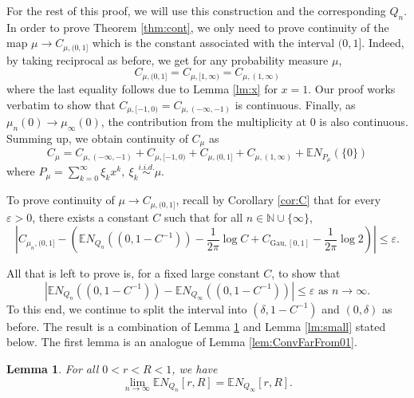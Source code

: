 \documentclass[12pt, reqno]{amsart}
\theoremstyle{plain}
\newtheorem{lemma}[theorem]{Lemma}
\theoremstyle{definition}
\newcommand\N{{\mathbb{N}}}
\newcommand\E{{\mathbb{E}}}
\newcommand{\ep}{\varepsilon}
\begin{document}
For the rest of this proof, we will use this construction and the corresponding $Q_{n}$. In order to prove Theorem \ref{thm:cont}, we only need to prove continuity of the map $\mu\to C_{\mu, (0, 1]}$ which is the constant associated with the interval $(0, 1]$. Indeed, by taking reciprocal as before, we get for any probability measure $\mu$,
$$C_{\mu, (0, 1]} = C_{\mu, [1, \infty)} = C_{\mu, (1, \infty)}$$
where the last equality follows due to Lemma \ref{lm:x} for $x = 1$. Our proof works verbatim to show that $C_{\mu, [-1, 0)} = C_{\mu, (-\infty, -1)} $ is continuous. Finally, as $\mu_n(0)\to\mu_{\infty}(0)$, the contribution from the multiplicity at $0$ is also continuous. Summing up, we obtain continuity of $C_{\mu}$ as
$$C_{\mu}=C_{\mu, (-\infty, -1)} +C_{\mu, [-1, 0)} + C_{\mu, (0, 1]} + C_{\mu, (1, \infty)}+\E N_{P_{\mu}}(\{0\})$$
where $P_{\mu} = \sum_{k=0}^{\infty} \xi_k x^{k}, \ \xi_k\overset{i.i.d.}{\sim}\mu.$

 To prove continuity of $\mu\to C_{\mu, (0, 1]}$, recall by Corollary \ref{cor:C} that for every $\ep>0$, there exists a constant $C$ such that for all $n\in \N\cup \{\infty\}$,
$$\left |	C_{\mu_n, (0, 1]}  - \left (\E N_{Q_{n}} \left (\left (0, 1-C^{-1}\right )\right )  -\frac{1}{2\pi}\log C+ C_{\mathrm{Gau}, [0, 1]}- \frac{1}{2\pi}\log 2 \right ) \right |\le \ep.$$

All that is left to prove is, for a fixed large constant $C$, to show that 
$$|\E N_{Q_{n}} \left (\left (0, 1-C^{-1}\right )\right ) - \E N_{Q_{\infty}} \left (\left (0, 1-C^{-1}\right )\right ) |\le \ep \text{ as } n\to\infty.$$ 
To this end, we continue to split the interval into $\left (\delta, 1-C^{-1}\right )$ and $(0, \delta)$ as before. The result is a combination of Lemma \ref{lem:ConvFarFrom01Cont} and Lemma \ref{lm:small} stated below. 
The first lemma is an analogue of Lemma \ref{lem:ConvFarFrom01}.
\begin{lemma}\label{lem:ConvFarFrom01Cont}
For all $0 < r < R < 1$, we have $$\lim_{n \rightarrow \infty}\E N_{Q_{n}}[r, R] = \E N_{Q_\infty}[r, R].$$
\end{lemma}
\end{document}
